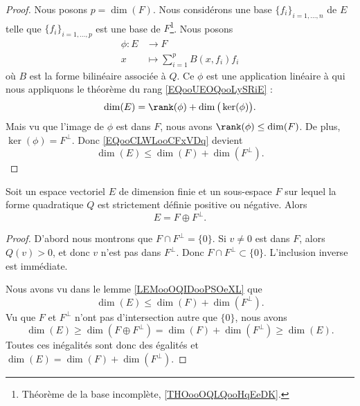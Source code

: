 \begin{proof}
	Nous posons \( p=\dim(F)\). Nous considérons une base \( \{ f_i \}_{i=1,\ldots, n}\) de \( E\) telle que \( \{ f_i \}_{i=1,\ldots, p}\) est une base de \( F\)\footnote{Théorème de la base incomplète, \ref{THOooOQLQooHqEeDK}.}. Nous posons
	\begin{equation}
		\begin{aligned}
			\phi\colon E & \to F                           \\
			x            & \mapsto \sum_{i=1}^pB(x,f_i)f_i
		\end{aligned}
	\end{equation}
	où \( B\) est la forme bilinéaire associée à \( Q\). Ce \( \phi\) est une application linéaire à qui nous appliquons le théorème du rang \eqref{EQooUEOQooLySRiE} :
	\begin{equation}        \label{EQooCLWLooCFxVDq}
		\dim(E)=\rank(\phi)+\dim\big( \ker(\phi) \big).
	\end{equation}
	Mais vu que l'image de \( \phi\) est dans \( F\), nous avons \( \rank(\phi)\leq \dim(F)\). De plus, \( \ker(\phi)=F^{\perp}\). Donc \eqref{EQooCLWLooCFxVDq} devient
	\begin{equation}
		\dim(E)\leq \dim(F)+\dim(F^{\perp}).
	\end{equation}
\end{proof}

\begin{lemma}     \label{LEMooUOZOooYvEcji}
	Soit un espace vectoriel \( E\) de dimension finie et un sous-espace \( F\) sur lequel la forme quadratique \( Q\) est strictement définie positive ou négative. Alors
	\begin{equation}
		E=F\oplus F^{\perp}.
	\end{equation}
\end{lemma}

\begin{proof}
	D'abord nous montrons que \( F\cap F^{\perp}=\{ 0 \}\). Si \( v\neq 0\) est dans \( F\), alors \( Q(v)>0\), et donc \( v\) n'est pas dans \( F^{\perp}\). Donc \( F\cap F^{\perp}\subset \{ 0 \}\). L'inclusion inverse est immédiate.

	Nous avons vu dans le lemme \ref{LEMooOQIDooPSOeXL} que
	\begin{equation}
		\dim(E)\leq \dim(F)+\dim(F^{\perp}).
	\end{equation}
	Vu que \( F\) et \( F^{\perp}\) n'ont pas d'intersection autre que \( \{ 0 \}\), nous avons
	\begin{equation}
		\dim(E)\geq\dim(F\oplus F^{\perp}) = \dim(F)+\dim(F^{\perp}) \geq\dim(E).
	\end{equation}
	Toutes ces inégalités sont donc des égalités et \( \dim(E)=\dim(F)+\dim(F^{\perp})\).
\end{proof}

